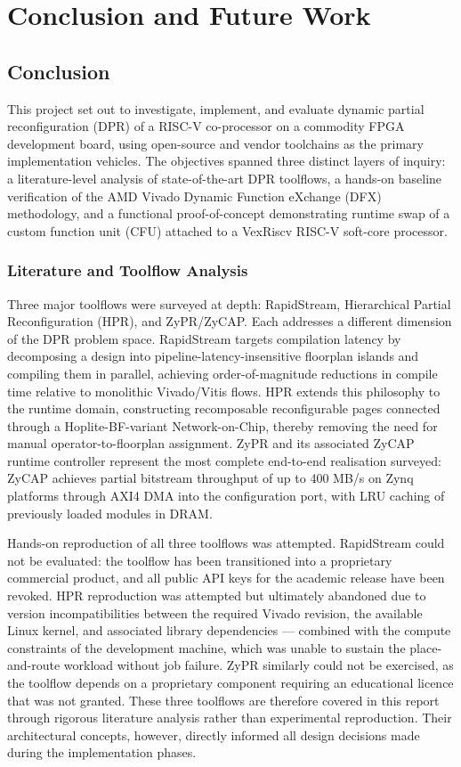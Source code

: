 \chapter{Conclusion and Future Work}

\section{Conclusion}

This project set out to investigate, implement, and evaluate dynamic partial reconfiguration (DPR) of a RISC-V co-processor on a commodity FPGA development board, using open-source and vendor toolchains as the primary implementation vehicles. The objectives spanned three distinct layers of inquiry: a literature-level analysis of state-of-the-art DPR toolflows, a hands-on baseline verification of the AMD Vivado Dynamic Function eXchange (DFX) methodology, and a functional proof-of-concept demonstrating runtime swap of a custom function unit (CFU) attached to a VexRiscv RISC-V soft-core processor.

\subsection{Literature and Toolflow Analysis}

Three major toolflows were surveyed at depth: RapidStream, Hierarchical Partial Reconfiguration (HPR), and ZyPR/ZyCAP. Each addresses a different dimension of the DPR problem space. RapidStream targets compilation latency by decomposing a design into pipeline-latency-insensitive floorplan islands and compiling them in parallel, achieving order-of-magnitude reductions in compile time relative to monolithic Vivado/Vitis flows. HPR extends this philosophy to the runtime domain, constructing recomposable reconfigurable pages connected through a Hoplite-BF-variant Network-on-Chip, thereby removing the need for manual operator-to-floorplan assignment. ZyPR and its associated ZyCAP runtime controller represent the most complete end-to-end realisation surveyed: ZyCAP achieves partial bitstream throughput of up to 400 MB/s on Zynq platforms through AXI4 DMA into the configuration port, with LRU caching of previously loaded modules in DRAM.

Hands-on reproduction of all three toolflows was attempted. RapidStream could not be evaluated: the toolflow has been transitioned into a proprietary commercial product, and all public API keys for the academic release have been revoked. HPR reproduction was attempted but ultimately abandoned due to version incompatibilities between the required Vivado revision, the available Linux kernel, and associated library dependencies — combined with the compute constraints of the development machine, which was unable to sustain the place-and-route workload without job failure. ZyPR similarly could not be exercised, as the toolflow depends on a proprietary component requiring an educational licence that was not granted. These three toolflows are therefore covered in this report through rigorous literature analysis rather than experimental reproduction. Their architectural concepts, however, directly informed all design decisions made during the implementation phases.

